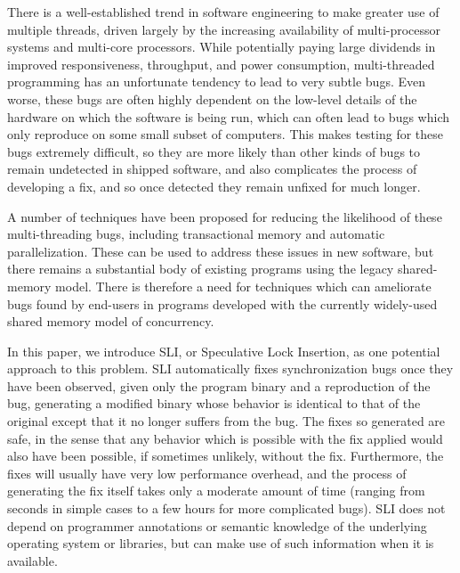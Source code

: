 \documentclass[10pt,twocolumn,preprint,natbib,authoryear]{sigplanconf}
\begin{document}
There is a well-established trend in software engineering to make
greater use of multiple threads, driven largely by the increasing
availability of multi-processor systems and multi-core processors.
While potentially paying large dividends in improved responsiveness,
throughput, and power consumption, multi-threaded programming has an
unfortunate tendency to lead to very subtle bugs.  Even worse, these
bugs are often highly dependent on the low-level details of the
hardware on which the software is being run, which can often lead to
bugs which only reproduce on some small subset of computers.  This
makes testing for these bugs extremely difficult, so they are more
likely than other kinds of bugs to remain undetected in shipped
software, and also complicates the process of developing a fix, and so
once detected they remain unfixed for much longer.

A number of techniques have been proposed for reducing the likelihood
of these multi-threading bugs, including transactional
memory\cite{Shavit1997} and automatic parallelization\cite{Bacon1994}.
These can be used to address these issues in new software, but there
remains a substantial body of existing programs using the legacy
shared-memory model.  There is therefore a need for techniques which
can ameliorate bugs found by end-users in programs developed with the
currently widely-used shared memory model of concurrency.

In this paper, we introduce SLI, or Speculative Lock Insertion, as one
potential approach to this problem.  SLI automatically fixes
synchronization bugs once they have been observed, given only the
program binary and a reproduction of the bug, generating a modified
binary whose behavior is identical to that of the original except that
it no longer suffers from the bug.  The fixes so generated are safe,
in the sense that any behavior which is possible with the fix applied
would also have been possible, if sometimes unlikely, without the fix.
Furthermore, the fixes will usually have very low performance
overhead, and the process of generating the fix itself takes only a
moderate amount of time (ranging from seconds in simple cases to a few
hours for more complicated bugs).  SLI does not depend on programmer
annotations or semantic knowledge of the underlying operating system
or libraries, but can make use of such information when it is
available.
\end{document}
